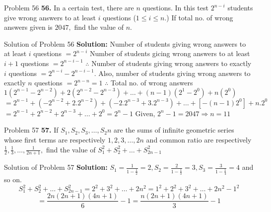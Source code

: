 \documentclass[aspectratio=1610,8pt]{beamer}
\begin{document}
\begin{frame}{Problem 56}
  \textbf{56.} In a certain test, there are $n$ questions. In this test $2^{n - i}$ students give wrong answers to at least $i$
  questions ($1\leq i \leq n.$) If total no. of wrong answers given is $2047,$ find the value of $n.$
\end{frame}
\begin{frame}{Solution of Problem 56}
  \textbf{Solution:} Number of students giving wrong answers to at least $i$ questions $= 2^{n - i}$
  \linebreak\linebreak
  Number of students gicing wrong answers to at least $i + 1$ questions $= 2^{n - i - 1}$
  \linebreak\linebreak
  $\therefore$ Number of students giving wrong answers to exactly $i$ questions $= 2^{n - i} - 2^{n - i - 1}.$ Also, number of
  students giving wrong answers to exactly $n$ questions $= 2^{n - n} = 1$
  \linebreak\linebreak
  $\therefore$ Total no. of wrong answers $1(2^{n - 1} - 2^{n - 2}) + 2(2^{n - 2} - 2^{n - 3}) + \ldots + (n - 1)(2^1 - 2^0) +
  n(2^0)$
  \linebreak\linebreak
  $= 2^{n - 1} + (-2^{n - 2} + 2.2^{n - 2}) + (-2.2^{n - 3} + 3.2^{n - 3}) + \ldots + \left[-(n - 1)2^0\right] + n.2^0$
  \linebreak\linebreak
  $= 2^{n - 1} + 2^{n - 2} + 2^{n - 3} + \ldots + 2^0 = 2^n - 1$
  \linebreak\linebreak
  Given, $2^n - 1 = 2047 \Rightarrow n = 11$
\end{frame}
\begin{frame}{Problem 57}
  \textbf{57.} If $S_1, S_2, S_3, \ldots, S_2n$ are the sums of infinite geometric series whose first terms are respectively $1, 2,
  3, \ldots, 2n$ and common ratio are respectively $\frac{1}{2}, \frac{1}{3}, \ldots, \frac{1}{2n + 1},$ find the value of $S_1^2 +
  S_2^2 + \ldots + S_{2n - 1}^2$
\end{frame}
\begin{frame}{Solution of Problem 57}
  \textbf{Solution:} $S_1 = \frac{1}{1 - \frac{1}{2}} = 2, S_2 = \frac{2}{1 - \frac{1}{3}} = 3, S_3 = \frac{3}{1 - \frac{1}{4}} =
  4$ and so on.
  $$S_1^2 + S_2^2 + \ldots + S_{2n - 1}^2 = 2^2 + 3^2 + \ldots + 2n^2 = 1^2 + 2^2 + 3^2 + \ldots + 2n^2 - 1^2$$
  $$= \frac{2n(2n + 1)(4n + 1)}{6} - 1 = \frac{n(2n + 1)(4n + 1)}{3} - 1$$
\end{frame}
\end{document}
